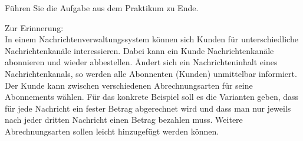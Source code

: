 \documentclass{abgabe}
\begin{document}
\begin{questions}

    Führen Sie die Aufgabe aus dem Praktikum zu Ende.

    Zur Erinnerung:\\
    In einem Nachrichtenverwaltungssystem können sich Kunden für unterschiedliche Nachrichtenkanäle interessieren.
    Dabei kann ein Kunde Nachrichtenkanäle abonnieren und wieder abbestellen.
    Ändert sich ein Nachrichteninhalt eines Nachrichtenkanals, so werden alle Abonnenten (Kunden) unmittelbar informiert.
    Der Kunde kann zwischen verschiedenen Abrechnungsarten für seine Abonnements wählen.
    Für das konkrete Beispiel soll es die Varianten geben, dass für jede Nachricht ein fester Betrag abgerechnet wird und dass man nur jeweils nach jeder dritten Nachricht einen Betrag bezahlen muss.
    Weitere Abrechnungsarten sollen leicht hinzugefügt werden können.

\end{questions}
\end{document}
